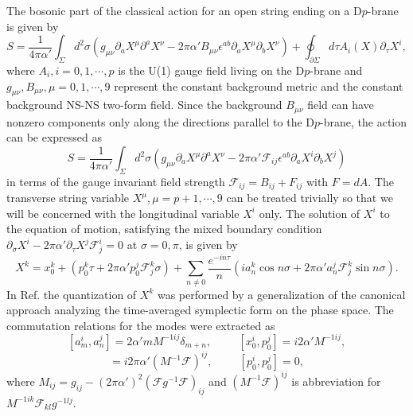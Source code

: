 \documentclass[12pt,a4paper]{article}
\newcommand{\al}{\alpha'}
\newcommand{\e}{\epsilon}
\newcommand{\F}{\mathcal{F}}
\begin{document}
The bosonic part of the classical action for an open string ending on a 
D$p$-brane is given by
\begin{equation}
S = \frac{1}{4\pi \al}\int_{\Sigma}d^2\sigma (g_{\mu\nu}\partial_aX^{\mu}
\partial^aX^{\nu} - 2\pi \al B_{\mu\nu}\e^{ab}\partial_aX^{\mu}\partial_b
X^{\nu})+\oint_{\partial\Sigma}d\tau A_i(X)\partial_{\tau}X^i,
\end{equation}
where $A_i, i = 0,1,\cdots,p$ is the U(1) gauge field living on the 
D$p$-brane and $g_{\mu\nu}, B_{\mu\nu}, \mu = 0,1,\cdots,9$ represent the
constant background metric and the constant background NS-NS two-form 
field.  Since the background $B_{\mu\nu}$ field can have nonzero 
components only along the directions parallel to the D$p$-brane, the 
action can be expressed as 
\begin{equation}
S = \frac{1}{4\pi \al}\int_{\Sigma}d^2\sigma (g_{\mu\nu}\partial_aX^{\mu}
\partial^aX^{\nu} - 2\pi \al \F_{ij}\e^{ab}\partial_aX^{i}\partial_b
X^{j})
\end{equation}
in terms of the gauge invariant field strength 
$\F_{ij} = B_{ij} + F_{ij}$ with $F = dA$. The transverse string
variable $X^{\mu}, \mu = p+1,\cdots,9$ can be treated trivially so
that we will be concerned with the longitudinal variable $X^i$ only.
The solution of $X^i$ to the equation of motion, satisfying the mixed
boundary condition $\partial_{\sigma}X^i - 2\pi\al\partial_{\tau}
X^j\F_j^i = 0$ at $\sigma = 0, \pi$, is given by  
\begin{equation}
X^k = x_0^k + ( p_0^k\tau + 2\pi\al p_0^j\F_j^k\sigma )  
 + \sum_{n\neq 0}\frac{e^{-in\tau}}{n}(ia_n^k \cos n\sigma + 2\pi\al
a_n^j\F_j^k \sin n\sigma).
\label{mod}\end{equation}
In Ref. \cite{CH} the quantization of $X^k$ was performed by a 
generalization of the canonical approach analyzing the 
time-averaged symplectic form on the phase space. The commutation 
relations for the modes were extracted as 
\[ [a_m^i, a_n^j] = 2\al mM^{-1ij}\delta_{m+n}, \hspace{1cm} 
[x_0^i, p_0^j] =i2\al M^{-1ij}, \]
\begin{equation}
 [x_0^i, x_0^j] = i2\pi \al(M^{-1}\F)^{ij},  \hspace{1cm}
 [p_0^i, p_0^j] = 0,
\label{com}\end{equation}
where $M_{ij} = g_{ij} - (2\pi\al)^2(\F g^{-1}\F)_{ij}$ and 
$(M^{-1}\F)^{ij}$ is abbreviation for $M^{-1ik}\F_{kl}g^{-1lj}$.
\end{document}
